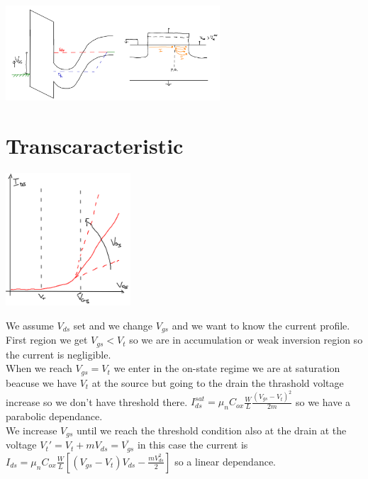 \centering
\includegraphics[width=0.6\textwidth]{2delectro.png}\\
\raggedright

\section{Transcaracteristic}

\centering
\includegraphics[width=0.35\textwidth]{transcaracteristic.png}\\
\raggedright

We assume $V_{ds}$ set and we change $V_{gs}$ and we want to know the current profile.\\
First region we get $V_{gs}<V_{t}$ so we are in accumulation or weak inversion region so the current is negligible.\\
When we reach $V_{gs}=V_t$ we enter in the on-state regime we are at saturation beacuse we have $V_{t}$ at the source but going to the drain the thrashold voltage increase so we don't have threshold there. $I_{ds}^{sat}=\mu_nC_{ox}\frac{W}{L}\frac{(V_{gs}-V_t)^2}{2m}$ so we have a parabolic dependance.\\
We increase $V_{gs}$ until we reach the threshold condition also at the drain at the voltage $V_t'=V_t+m V_{ds}=\overline{V_{gs}}$  in this case the current is $I_{ds}=\mu_nC_{ox}\frac{W}{L}[(V_{gs}-V_t)V_{ds}-\frac{mV_{ds}^2}{2}]$ so a linear dependance.\\

